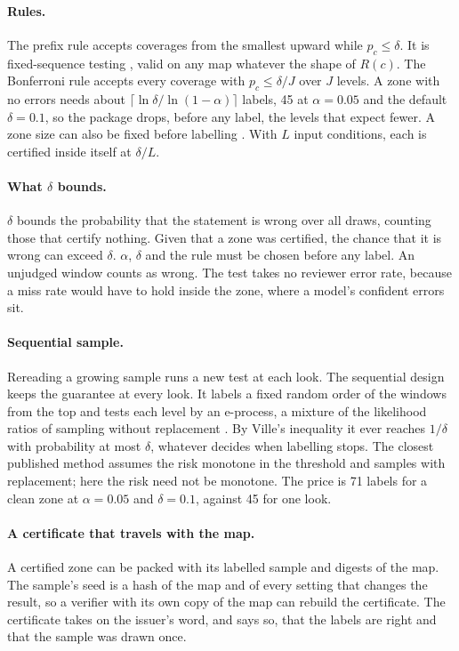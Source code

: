 \documentclass[11pt,a4paper]{article}
\begin{document}
\paragraph{Rules.} The prefix rule accepts coverages from the smallest upward while $p_c \le \delta$. It is
fixed-sequence testing \citep{angelopoulos2021}, valid on any map whatever the shape of $R(c)$. The Bonferroni rule
accepts every coverage with $p_c \le \delta/J$ over $J$ levels. A zone with no errors needs about
$\lceil \ln\delta / \ln(1-\alpha) \rceil$ labels, 45 at $\alpha = 0.05$ and the default $\delta = 0.1$, so the
package drops, before any label, the levels that expect fewer. A zone size can also be fixed before labelling
\citep{wiens2003,wiens2005}. With $L$ input conditions, each is certified inside itself at $\delta/L$.

\paragraph{What $\delta$ bounds.} $\delta$ bounds the probability that the statement is wrong over all draws,
counting those that certify nothing. Given that a zone was certified, the chance that it is wrong can exceed
$\delta$. $\alpha$, $\delta$ and the rule must be chosen before any label. An unjudged window counts as wrong. The
test takes no reviewer error rate, because a miss rate would have to hold inside the zone, where a model's confident
errors sit.

\paragraph{Sequential sample.} Rereading a growing sample runs a new test at each look. The sequential design keeps
the guarantee at every look. It labels a fixed random order of the windows from the top and tests each level by an
e-process, a mixture of the likelihood ratios of sampling without replacement \citep{robbins1970}. By Ville's
inequality \citep{ville1939} it ever reaches $1/\delta$ with probability at most $\delta$, whatever decides when
labelling stops. The closest published method \citep{xu2024} assumes the risk monotone in the
threshold and samples with replacement; here the risk need not be monotone. The price is 71 labels for a clean zone
at $\alpha = 0.05$ and $\delta = 0.1$, against 45 for one look.

\paragraph{A certificate that travels with the map.}
\label{sec:certificate}
A certified zone can be packed with its labelled sample and digests of the map. The sample's seed is a hash of the
map and of every setting that changes the result, so a verifier with its own copy of the map can rebuild the
certificate. The certificate takes on the issuer's word, and says so, that the labels are right and that the sample
was drawn once.
\end{document}
